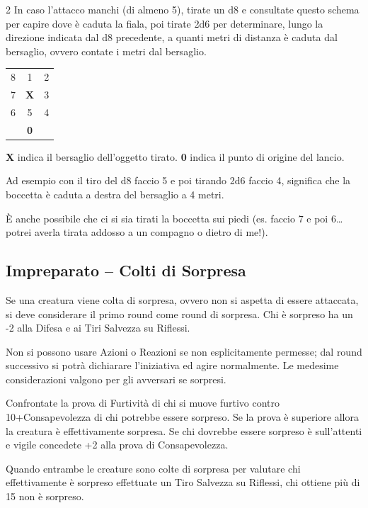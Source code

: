 \begin{multicols}{2}
In caso l'attacco manchi (di almeno 5), tirate un d8 e consultate questo schema per capire dove è caduta la fiala, poi tirate 2d6 per determinare, lungo la direzione indicata dal d8 precedente, a quanti metri di distanza è caduta dal bersaglio, ovvero contate i metri dal bersaglio.

\medskip
\begin{center}

\begin{tabular}{ccc}
 8& 1& 2\\
 \rowcolor{gray!20}	7 &\textbf{X}& 3\\
 6 &5 &4\\
	&\textbf{0}&
\end{tabular}
\end{center}

\smallskip

\textbf{X} indica il bersaglio dell'oggetto tirato. \textbf{0} indica il punto di origine del lancio.

Ad esempio con il tiro del d8 faccio 5 e poi tirando 2d6 faccio 4, significa che la boccetta è caduta a destra del bersaglio a 4 metri.

È anche possibile che ci si sia tirati la boccetta sui piedi (es. faccio 7 e poi 6… potrei averla tirata addosso a un compagno o dietro di me!).

\subsection{Impreparato -- Colti di Sorpresa}\label{coltidisorpresa}\hypertarget{coltidisorpresa}{}\hypertarget{sorpresa}{}

Se una creatura viene colta di sorpresa, ovvero non si aspetta di essere attaccata, si deve considerare il primo round come round di sorpresa. Chi è sorpreso ha un -2 alla Difesa e ai Tiri Salvezza su Riflessi.

Non si possono usare Azioni o Reazioni se non esplicitamente permesse; dal round successivo si potrà dichiarare l'iniziativa ed agire normalmente. Le medesime considerazioni valgono per gli avversari se sorpresi.

Confrontate la prova di Furtività di chi si muove furtivo contro 10+Consapevolezza di chi potrebbe essere sorpreso. Se la prova è superiore allora la creatura è effettivamente sorpresa. Se chi dovrebbe essere sorpreso è sull'attenti e vigile concedete +2 alla prova di Consapevolezza.

Quando entrambe le creature sono colte di sorpresa per valutare chi effettivamente è sorpreso effettuate un Tiro Salvezza su Riflessi, chi ottiene più di 15 non è sorpreso.


\end{multicols}
